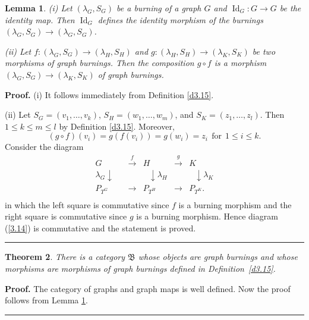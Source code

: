 \documentclass[a4paper, 11pt]{article}
\newtheorem{theorem}{Theorem}[section]
\newtheorem{lemma}[theorem]{Lemma}
\newenvironment{proof}[1][Proof]{\textbf{#1.} }{\ \rule{0.5em}{0.5em}}
\begin{document}
\begin{lemma}\label{l3.17} {\rm (i) } Let $(\lambda_G, S_G)$ be a burning of a graph $G$ and $\operatorname{Id}_G \colon G\to G$ be the identity  map. Then $\operatorname{Id}_G$ defines  the identity morphism of the burnings   
$(\lambda_G, S_G) \to  (\lambda_G, S_G) $.

{\rm (ii) } Let $f\colon (\lambda_G, S_G)\to (\lambda_H, S_H)$ and $g\colon  (\lambda_H, S_H)\to  (\lambda_K, S_K)$ be two  morphisms of graph burnings.  Then the composition $g\circ f$ is a  morphism $(\lambda_G, S_G)\to  (\lambda_K, S_K)$
of graph burnings. 
\end{lemma}
\begin{proof} 
 {\rm (i) } It follows immediately from  Definition \ref{d3.15}.  
 
{\rm (ii) } Let $S_G=(v_1,\dots, v_k)$, $S_H=(w_1, \dots , w_m)$, and 
$S_K=(z_1, \dots , z_l)$. Then   $1\leq k\leq m\leq l$ by Definition \ref{d3.15}. Moreover, 
$$
(g\circ f)(v_i)= g(f(v_i))=g(w_i)=z_i \ \ \text{for} \ \ 1\leq i\leq k.
$$
Consider the diagram 
\begin{equation}\label{3.14}
\begin{matrix}
G &\overset{f}\longrightarrow & H&\overset{g}\longrightarrow & K\\
\lambda_G\downarrow\ \ \  \ &&\ \ \ \downarrow\lambda_H && \ \ \ \downarrow\lambda_K\\
P_{T^G} &\longrightarrow & P_{T^H} &\longrightarrow & P_{T^K}. \\
\end{matrix}
\end{equation}
in which the left square is commutative since $f$ is a burning morphism and the right square is commutative since $g$ is a burning morphism. Hence diagram 
(\ref{3.14}) is commutative and the statement is proved. 
\end{proof}


\begin{theorem}\label{t3.18}  There is a category $\mathfrak{B}$ whose objects are graph burnings  and whose morphisms are morphisms of graph burnings defined in Definition~\ref{d3.15}.
\end{theorem} 
\begin{proof} The category of graphs and graph maps is well defined. Now the proof follows from Lemma \ref{l3.17}. 
\end{proof}
\end{document}
